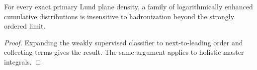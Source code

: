 \begin{lemma}[Universality]\label{thm:2}
For every exact primary Lund plane density, a family of logarithmically
enhanced cumulative distributions is insensitive to hadronization beyond
the strongly ordered limit.
\end{lemma}

\begin{proof}
Expanding the weakly supervised classifier to next-to-leading order and
collecting terms gives the result. The same argument applies to holistic
master integrals.
\end{proof}

